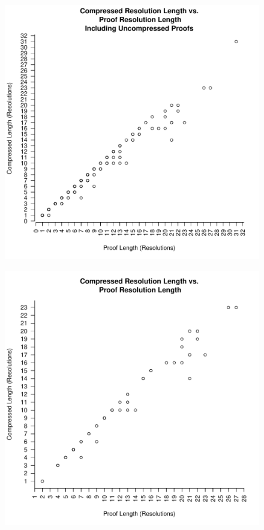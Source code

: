\begin{figure}
\includegraphics[scale=0.5]{images/res_length_vs_compress_res_length_all_proofs.pdf}
\end{figure}
\begin{figure}
\includegraphics[scale=0.5]{images/res_length_vs_compress_res_length.pdf}
\end{figure}

